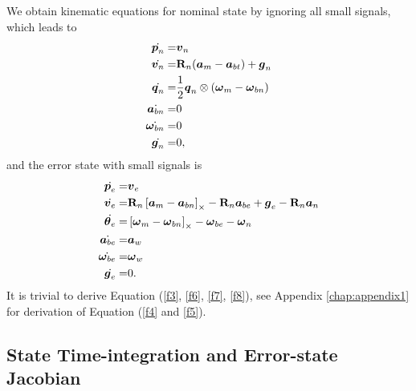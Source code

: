 We obtain kinematic equations for nominal state by ignoring all small signals, which leads to
\begin{align}
	\label{f12}
	\dot{\boldsymbol{p}_n} =& \boldsymbol{v}_n \\
	\label{f11}
	\dot{\boldsymbol{v}_n} =& \mathbf{R}_n(\boldsymbol{a}_m - \boldsymbol{a}_{bt}) + \boldsymbol{g}_n\\
	\dot{\boldsymbol{q}_n} =& \frac{1}{2}\boldsymbol{q}_n \otimes (\boldsymbol{\omega}_m - \boldsymbol{\omega}_{bn})\\
	\dot{\boldsymbol{a}_{bn}} =& 0 \\
	\dot{\boldsymbol{\omega}_{bn}} =& 0 \\ 
	\label{f13}
	\dot{\boldsymbol{g}_n} =& 0,
\end{align}
and the error state with small signals is
\begin{align}
	\label{f3}
	\dot{\boldsymbol{p}_e} =& \boldsymbol{v}_e \\
	\label{f4}
	\dot{\boldsymbol{v}_e} =& \mathbf{R}_n \left[ \boldsymbol{a}_m - \boldsymbol{a}_{bn} \right]_{\times} -  \mathbf{R}_n\boldsymbol{a}_{be} + \boldsymbol{g}_e - \mathbf{R}_n\boldsymbol{a}_n\\
	\label{f5}
	\dot{\boldsymbol{\theta}_e} =& \left[ \boldsymbol{\omega}_m - \boldsymbol{\omega}_{bn} \right]_{\times} - \boldsymbol{\omega}_{be} - \boldsymbol{\omega}_{n}\\
	\label{f6}
	\dot{\boldsymbol{a}_{be}} =& \boldsymbol{a}_w \\
	\label{f7}
	\dot{\boldsymbol{\omega}_{be}} =& \boldsymbol{\omega}_{w} \\ 
	\label{f8}
	\dot{\boldsymbol{g}_e} =& 0. 
\end{align}
It is trivial to derive Equation (\ref{f3}, \ref{f6}, \ref{f7}, \ref{f8}), see Appendix \ref{chap:appendix1} for derivation of Equation (\ref{f4} and \ref{f5}).

\subsection{State Time-integration and Error-state Jacobian}
\label{subsec:ESKF_IMU_sub3}

